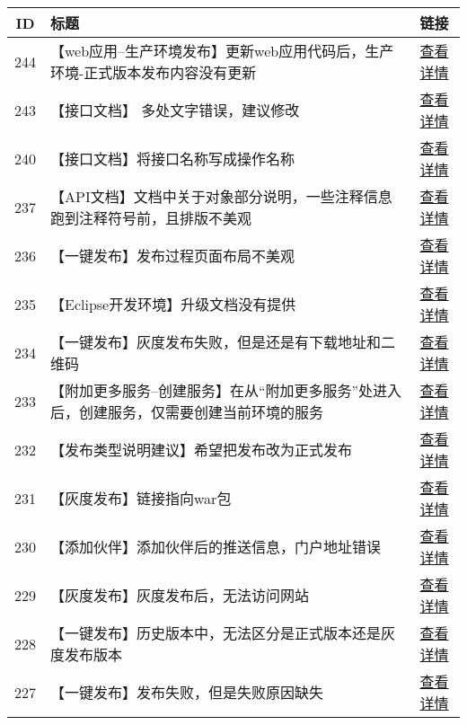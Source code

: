 \documentclass{article}
\begin{document}
\begin{table}[H]
\renewcommand{\arraystretch}{1.5}
\begin{tabular}{|c|p{11cm}|c|}
\hline
ID & 标题 & 链接 \\
\hline
244 & 【web应用--生产环境发布】更新web应用代码后，生产环境-正式版本发布内容没有更新 & \href{http://pms.sdp.nd/index.php?m=bug\&f=view\&bugID=244}{查看详情}\\
\hline
243 & 【接口文档】 多处文字错误，建议修改 & \href{http://pms.sdp.nd/index.php?m=bug\&f=view\&bugID=243}{查看详情}\\
\hline
240 & 【接口文档】将接口名称写成操作名称 & \href{http://pms.sdp.nd/index.php?m=bug\&f=view\&bugID=240}{查看详情}\\
\hline
237 & 【API文档】文档中关于对象部分说明，一些注释信息跑到注释符号前，且排版不美观 & \href{http://pms.sdp.nd/index.php?m=bug\&f=view\&bugID=237}{查看详情}\\
\hline
236 & 【一键发布】发布过程页面布局不美观 & \href{http://pms.sdp.nd/index.php?m=bug\&f=view\&bugID=236}{查看详情}\\
\hline
235 & 【Eclipse开发环境】升级文档没有提供 & \href{http://pms.sdp.nd/index.php?m=bug\&f=view\&bugID=235}{查看详情}\\
\hline
234 & 【一键发布】灰度发布失败，但是还是有下载地址和二维码 & \href{http://pms.sdp.nd/index.php?m=bug\&f=view\&bugID=234}{查看详情}\\
\hline
233 & 【附加更多服务--创建服务】在从“附加更多服务”处进入后，创建服务，仅需要创建当前环境的服务 & \href{http://pms.sdp.nd/index.php?m=bug\&f=view\&bugID=233}{查看详情}\\
\hline
232 & 【发布类型说明建议】希望把发布改为正式发布 & \href{http://pms.sdp.nd/index.php?m=bug\&f=view\&bugID=232}{查看详情}\\
\hline
231 & 【灰度发布】链接指向war包 & \href{http://pms.sdp.nd/index.php?m=bug\&f=view\&bugID=231}{查看详情}\\
\hline
230 & 【添加伙伴】添加伙伴后的推送信息，门户地址错误 & \href{http://pms.sdp.nd/index.php?m=bug\&f=view\&bugID=230}{查看详情}\\
\hline
229 & 【灰度发布】灰度发布后，无法访问网站 & \href{http://pms.sdp.nd/index.php?m=bug\&f=view\&bugID=229}{查看详情}\\
\hline
228 & 【一键发布】历史版本中，无法区分是正式版本还是灰度发布版本 & \href{http://pms.sdp.nd/index.php?m=bug\&f=view\&bugID=228}{查看详情}\\
\hline
227 & 【一键发布】发布失败，但是失败原因缺失 & \href{http://pms.sdp.nd/index.php?m=bug\&f=view\&bugID=227}{查看详情}\\

\end{tabular}
\end{table}
\end{document}
